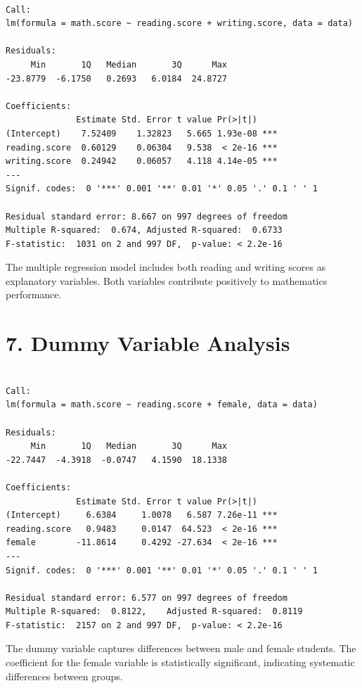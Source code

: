 \documentclass[
  letterpaper,
  DIV=11,
  numbers=noendperiod]{scrartcl}
\begin{document}
\begin{verbatim}

Call:
lm(formula = math.score ~ reading.score + writing.score, data = data)

Residuals:
     Min       1Q   Median       3Q      Max 
-23.8779  -6.1750   0.2693   6.0184  24.8727 

Coefficients:
              Estimate Std. Error t value Pr(>|t|)    
(Intercept)    7.52409    1.32823   5.665 1.93e-08 ***
reading.score  0.60129    0.06304   9.538  < 2e-16 ***
writing.score  0.24942    0.06057   4.118 4.14e-05 ***
---
Signif. codes:  0 '***' 0.001 '**' 0.01 '*' 0.05 '.' 0.1 ' ' 1

Residual standard error: 8.667 on 997 degrees of freedom
Multiple R-squared:  0.674, Adjusted R-squared:  0.6733 
F-statistic:  1031 on 2 and 997 DF,  p-value: < 2.2e-16
\end{verbatim}

The multiple regression model includes both reading and writing scores
as explanatory variables. Both variables contribute positively to
mathematics performance.

\section{7. Dummy Variable Analysis}\label{dummy-variable-analysis}

\begin{verbatim}

Call:
lm(formula = math.score ~ reading.score + female, data = data)

Residuals:
     Min       1Q   Median       3Q      Max 
-22.7447  -4.3918  -0.0747   4.1590  18.1338 

Coefficients:
              Estimate Std. Error t value Pr(>|t|)    
(Intercept)     6.6384     1.0078   6.587 7.26e-11 ***
reading.score   0.9483     0.0147  64.523  < 2e-16 ***
female        -11.8614     0.4292 -27.634  < 2e-16 ***
---
Signif. codes:  0 '***' 0.001 '**' 0.01 '*' 0.05 '.' 0.1 ' ' 1

Residual standard error: 6.577 on 997 degrees of freedom
Multiple R-squared:  0.8122,    Adjusted R-squared:  0.8119 
F-statistic:  2157 on 2 and 997 DF,  p-value: < 2.2e-16
\end{verbatim}

The dummy variable captures differences between male and female
students. The coefficient for the female variable is statistically
significant, indicating systematic differences between groups.
\end{document}
